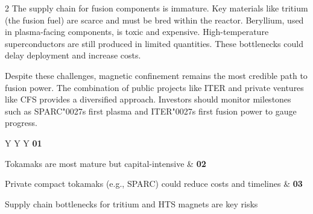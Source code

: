 \documentclass[10pt,a4paper]{article}
\newcommand{\BOApos}{{\BOQuoteFont\char"0027}}
\begin{document}
\begin{multicols}{2}
{\small The supply chain for fusion components is immature. Key materials like tritium (the fusion fuel) are scarce and must be bred within the reactor. Beryllium, used in plasma-facing components, is toxic and expensive. High-temperature superconductors are still produced in limited quantities. These bottlenecks could delay deployment and increase costs.}\par
{\small Despite these challenges, magnetic confinement remains the most credible path to fusion power. The combination of public projects like ITER and private ventures like CFS provides a diversified approach. Investors should monitor milestones such as SPARC\BOApos{}s first plasma and ITER\BOApos{}s first fusion power to gauge progress.}\par
\end{multicols}
\vspace{5pt}\noindent\begin{tabularx}{\linewidth}{Y Y Y}
{\textcolor{BOGreen}{\bfseries 01}}\par{\scriptsize\color{BOText} Tokamaks are most mature but capital-intensive} & {\textcolor{BOGreen}{\bfseries 02}}\par{\scriptsize\color{BOText} Private compact tokamaks (e.g., SPARC) could reduce costs and timelines} & {\textcolor{BOGreen}{\bfseries 03}}\par{\scriptsize\color{BOText} Supply chain bottlenecks for tritium and HTS magnets are key risks} \\
\end{tabularx}\par\vspace{2pt}
\label{chap:2:end}
\end{document}
